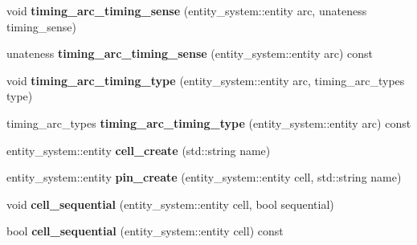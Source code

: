 \begin{DoxyCompactItemize}
\item 
\hypertarget{classophidian_1_1timing_1_1library_ae816113b74afb3128da82a8e4dcb9207}{void {\bfseries timing\-\_\-arc\-\_\-timing\-\_\-sense} (entity\-\_\-system\-::entity arc, unateness timing\-\_\-sense)}\label{classophidian_1_1timing_1_1library_ae816113b74afb3128da82a8e4dcb9207}

\item 
\hypertarget{classophidian_1_1timing_1_1library_af215c39a9f7677a608ba042504158818}{unateness {\bfseries timing\-\_\-arc\-\_\-timing\-\_\-sense} (entity\-\_\-system\-::entity arc) const }\label{classophidian_1_1timing_1_1library_af215c39a9f7677a608ba042504158818}

\item 
\hypertarget{classophidian_1_1timing_1_1library_aca07d3c8ba4e9999fb1c98d6d2392118}{void {\bfseries timing\-\_\-arc\-\_\-timing\-\_\-type} (entity\-\_\-system\-::entity arc, timing\-\_\-arc\-\_\-types type)}\label{classophidian_1_1timing_1_1library_aca07d3c8ba4e9999fb1c98d6d2392118}

\item 
\hypertarget{classophidian_1_1timing_1_1library_a1238fbbafa47e4fa50618005a8b4ff05}{timing\-\_\-arc\-\_\-types {\bfseries timing\-\_\-arc\-\_\-timing\-\_\-type} (entity\-\_\-system\-::entity arc) const }\label{classophidian_1_1timing_1_1library_a1238fbbafa47e4fa50618005a8b4ff05}

\item 
\hypertarget{classophidian_1_1timing_1_1library_aa825aabf0d5da3685e6a1007a431c6e8}{entity\-\_\-system\-::entity {\bfseries cell\-\_\-create} (std\-::string name)}\label{classophidian_1_1timing_1_1library_aa825aabf0d5da3685e6a1007a431c6e8}

\item 
\hypertarget{classophidian_1_1timing_1_1library_a1b428cc4175ca8ffec14da986637cce0}{entity\-\_\-system\-::entity {\bfseries pin\-\_\-create} (entity\-\_\-system\-::entity cell, std\-::string name)}\label{classophidian_1_1timing_1_1library_a1b428cc4175ca8ffec14da986637cce0}

\item 
\hypertarget{classophidian_1_1timing_1_1library_a134926b8096917cd3ed18bca84409ff8}{void {\bfseries cell\-\_\-sequential} (entity\-\_\-system\-::entity cell, bool sequential)}\label{classophidian_1_1timing_1_1library_a134926b8096917cd3ed18bca84409ff8}

\item 
\hypertarget{classophidian_1_1timing_1_1library_a3281d2aa472b91077561dcf9543a5f82}{bool {\bfseries cell\-\_\-sequential} (entity\-\_\-system\-::entity cell) const }\label{classophidian_1_1timing_1_1library_a3281d2aa472b91077561dcf9543a5f82}


\end{DoxyCompactItemize}
